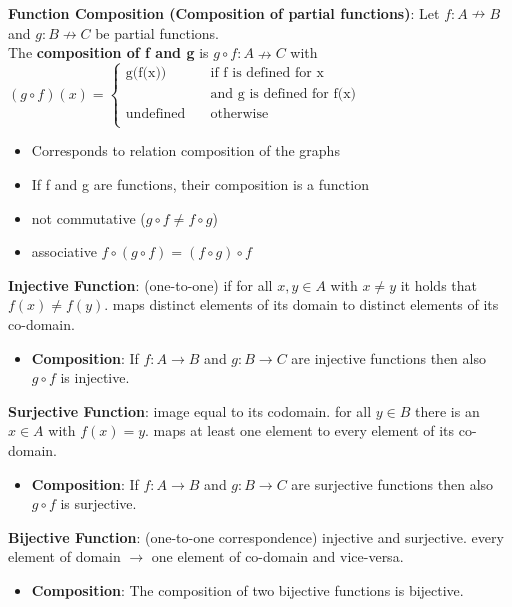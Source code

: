 \textbf{Function Composition (Composition of partial functions)}: Let $f: A \nrightarrow B$ and $g: B \nrightarrow C$ be partial functions.\\ The \textbf{composition of f and g} is $g \circ f: A \nrightarrow C$ with \\
$ (g \circ f)(x) = 
     \begin{cases}
       \text{g(f(x))} &\quad\text{if f is defined for x}\\
       \text{} &\quad\text{and g is defined for f(x)} \\
       \text{undefined} &\quad\text{otherwise} \\
     \end{cases}$ \\  
\begin{itemize}[noitemsep,topsep=0pt,leftmargin=*]
    \item Corresponds to relation composition of the graphs 
    \item If f and g are functions, their composition is a function
    \item not commutative ($g \circ f \neq f \circ g$)
    \item associative $f \circ (g \circ f) = (f \circ g) \circ f$
\end{itemize}
\textbf{Injective Function}: (one-to-one) if for all $x,y \in A$ with $x \neq y$ it holds that $f(x) \neq f(y)$. maps distinct elements of its domain to distinct elements of its co-domain. 
\begin{itemize}[noitemsep,topsep=0pt,leftmargin=*]
    \item \textbf{Composition}: If $f: A \rightarrow B$ and $g: B \rightarrow C$ are injective functions then also $g \circ f$ is injective.
\end{itemize}
\textbf{Surjective Function}: image equal to its codomain. for all $y \in B$ there is an $x \in A$ with $f(x) = y$. maps at least one element to every element of its co-domain. 
\begin{itemize}[noitemsep,topsep=0pt,leftmargin=*]
    \item \textbf{Composition}: If $f: A \rightarrow B$ and $g: B \rightarrow C$ are surjective functions then also $g \circ f$ is surjective. 
\end{itemize}
\textbf{Bijective Function}: (one-to-one correspondence) injective and surjective. every element of domain $\rightarrow$ one element of co-domain and vice-versa. 
\begin{itemize}[noitemsep,topsep=0pt,leftmargin=*]
    \item \textbf{Composition}: The composition of two bijective functions is bijective.
\end{itemize} 
